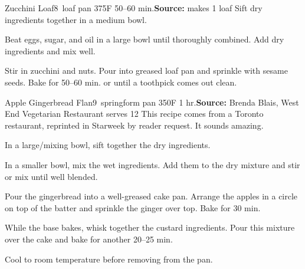 \begin{recipe}{Zucchini Loaf}{8\inch{}\inch\ loaf pan \hfill 375\0F \hfill 50--60 min.}{\textbf{Source:} \hfill makes 1 loaf}
 Sift dry ingredients together in a medium bowl.

 Beat eggs, sugar, and oil in a large bowl until thoroughly combined. Add dry ingredients and mix well.

 Stir in zucchini and nuts. Pour into greased loaf pan and sprinkle with sesame seeds. Bake for 50--60 min. or until a toothpick comes out clean.
\end{recipe}

\begin{recipe}{Apple Gingerbread Flan}{9\inch\ springform pan \hfill 350\0F \hfill 1 hr.}{\textbf{Source:} Brenda Blais, West End Vegetarian Restaurant \hfill serves 12}
 \freeform [CB] This recipe comes from a Toronto restaurant, reprinted in Starweek by reader request. It sounds amazing.

 In a large/mixing bowl, sift together the dry ingredients.

 In a smaller bowl, mix the wet ingredients. Add them to the dry mixture and stir or mix until well blended.

 Pour the gingerbread into a well-greased cake pan. Arrange the apples in a circle on top of the batter and sprinkle the ginger over top. Bake for 30 min.

 While the base bakes, whisk together the custard ingredients. Pour this mixture over the cake and bake for another 20--25 min.

 \newstep Cool to room temperature before removing from the pan.
\end{recipe}
